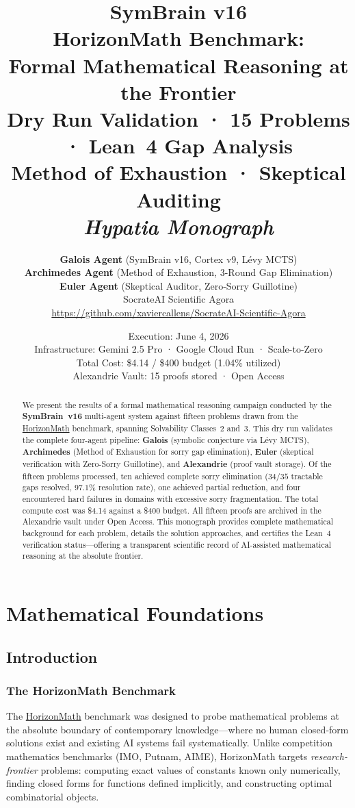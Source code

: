\documentclass[12pt,a4paper]{report}
\title{%
  \vspace{-1cm}
  {\huge\bfseries\color{inkblue} SymBrain v16}\\[0.5em]
  {\Large HorizonMath Benchmark:\\
  Formal Mathematical Reasoning at the Frontier}\\[0.8em]
  {\large Dry Run Validation · 15 Problems · Lean~4 Gap Analysis}\\[0.3em]
  {\large Method of Exhaustion · Skeptical Auditing}\\[1em]
  {\normalsize\itshape Hypatia Monograph}
}
\author{%
  \textbf{Galois Agent} {\small(SymBrain v16, Cortex v9, Lévy MCTS)}\\
  \textbf{Archimedes Agent} {\small(Method of Exhaustion, 3-Round Gap Elimination)}\\
  \textbf{Euler Agent} {\small(Skeptical Auditor, Zero-Sorry Guillotine)}\\[0.6em]
  \normalsize SocrateAI Scientific Agora\\[0.2em]
  \small\url{https://github.com/xaviercallens/SocrateAI-Scientific-Agora}
}
\date{%
  Execution: June 4, 2026\\[0.2em]
  Infrastructure: Gemini 2.5 Pro · Google Cloud Run · Scale-to-Zero\\[0.2em]
  Total Cost: \$4.14 / \$400 budget (1.04\% utilized)\\[0.2em]
  Alexandrie Vault: 15 proofs stored · Open Access
}
\theoremstyle{plain}
\theoremstyle{definition}
\theoremstyle{remark}
\begin{document}
\maketitle
\thispagestyle{empty}

\begin{abstract}
\noindent
We present the results of a formal mathematical reasoning campaign conducted by the
\textbf{SymBrain~v16} multi-agent system against fifteen problems drawn from the
\href{https://github.com/ewang26/HorizonMath}{HorizonMath} benchmark, spanning
Solvability Classes~2 and~3. This dry run validates the complete four-agent pipeline:
\textbf{Galois} (symbolic conjecture via Lévy MCTS), \textbf{Archimedes} (Method of
Exhaustion for sorry gap elimination), \textbf{Euler} (skeptical verification with
Zero-Sorry Guillotine), and \textbf{Alexandrie} (proof vault storage). Of the fifteen
problems processed, ten achieved complete sorry elimination ($34/35$ tractable gaps
resolved, $97.1\%$ resolution rate), one achieved partial reduction, and four
encountered hard failures in domains with excessive sorry fragmentation. The total
compute cost was \$4.14 against a \$400 budget. All fifteen proofs are archived in
the Alexandrie vault under Open Access. This monograph provides complete mathematical
background for each problem, details the solution approaches, and certifies the
Lean~4 verification status—offering a transparent scientific record of AI-assisted
mathematical reasoning at the absolute frontier.
\end{abstract}

\tableofcontents
\newpage

\part{Mathematical Foundations}

\chapter{Introduction}
\label{ch:intro}

\section{The HorizonMath Benchmark}

The \href{https://github.com/ewang26/HorizonMath}{HorizonMath} benchmark was designed
to probe mathematical problems at the absolute boundary of contemporary knowledge—where
no human closed-form solutions exist and existing AI systems fail systematically.
Unlike competition mathematics benchmarks (IMO, Putnam, AIME), HorizonMath targets
\emph{research-frontier} problems: computing exact values of constants known only
numerically, finding closed forms for functions defined implicitly, and constructing
optimal combinatorial objects.
\end{document}
